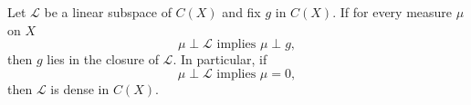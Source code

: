 
Let $\mathcal{L}$ be a linear subspace of $C(X)$ and fix $g$ in $C(X)$. If for every measure $\mu$ on $X$
$$\mu \perp \mathcal{L} \text{ implies } \mu \perp g,$$
then $g$ lies in the closure of $\mathcal{L}$. In particular, if
$$\mu \perp \mathcal{L} \text{ implies } \mu = 0,$$
then $\mathcal{L}$ is dense in $C(X)$.
